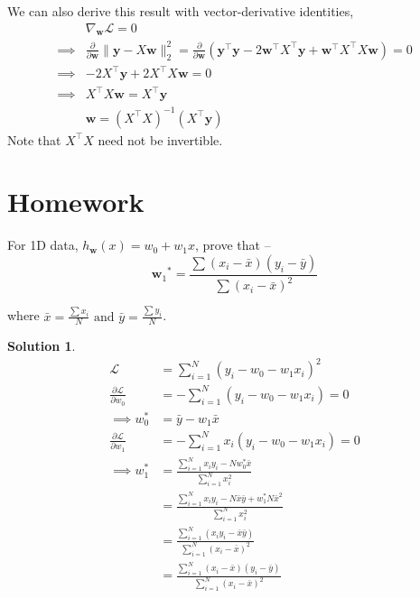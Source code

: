 \documentclass{report}
\newtheorem*{solution}{Solution}
\newcommand{\tr}[1]{{{#1}^\top}} %
\newcommand{\w}{\mathbf{w}} %
\newcommand{\y}{\mathbf{y}}
\newcommand{\loss}{\mathcal{L}}
\begin{document}
We can also derive this result with vector-derivative identities\footnotemark[1],
\begin{align*}
           & \nabla_\w\loss = 0                                                                                                                                       \\
  \implies & \frac{\partial }{\partial \w} \lVert \y-X\w\rVert_2^2 = \frac{\partial}{\partial \w}\left(\tr{\y}\y - 2\tr{\w} \tr{X} \y + \tr{\w} \tr{X} X\w\right) = 0 \\
  \implies & -2\tr{X} \y + 2\tr{X}X\w = 0                                                                                                                             \\
  \implies & \tr{X}X\w = \tr{X}\y                                                                                                                                     \\
           & \boxed{\w = (\tr{X} X)^{-1}(\tr{X} \y)}
\end{align*}
Note that \(\tr{X}X\) need not be invertible.

\section{Homework}
For 1D data, $ h_\w(x)=w_0+w_1 x $,
prove that --
\begin{equation*}
  {\w_1}^* = \frac{\sum (x_i-\bar{x})(y_i-\bar{y})}{\sum (x_i-\bar{x})^2}
\end{equation*}

where \(\bar{x} = \frac{\sum{x_i}}{N} \text{ \ and \ } \bar{y} = \frac{\sum{y_i}}{N}\).

\begin{solution}
  \begin{align*}
    \mathcal{L}                               & = \sum_{i=1}^N (y_i-w_0-w_1x_i)^2                                                     \\
    \frac{\partial \mathcal{L}}{\partial w_0} & = - \sum_{i=1}^N (y_i-w_0-w_1x_i) = 0                                                 \\
    \implies  w_0^*                           & = \bar{y} - w_1\bar{x}                                                                \\
    \frac{\partial \mathcal{L}}{\partial w_1} & = - \sum_{i=1}^N x_i(y_i-w_0-w_1x_i) = 0                                              \\
    \implies w_1^*                            & = \frac{\sum_{i=1}^N x_iy_i - Nw_0^*\bar{x}} {\sum_{i=1}^N x_i^2}                     \\
                                              & = \frac{\sum_{i=1}^N x_iy_i - N\bar{x}\bar{y} + w_1^*N\bar{x}^2} {\sum_{i=1}^N x_i^2} \\
                                              & = \frac{\sum_{i=1}^N (x_iy_i - \bar{x}\bar{y})} {\sum_{i=1}^N (x_i-\bar{x})^2}        \\
                                              & = \frac{\sum_{i=1}^N (x_i-\bar{x})(y_i-\bar{y})} {\sum_{i=1}^N (x_i-\bar{x})^2}
  \end{align*}
\end{solution}
\end{document}
